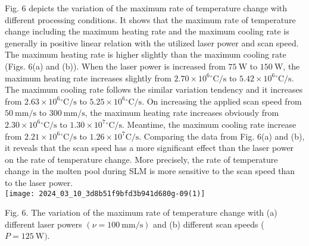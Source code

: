 \documentclass[10pt]{article}
\begin{document}
Fig. 6 depicts the variation of the maximum rate of temperature change with different processing conditions. It shows that the maximum rate of temperature change including the maximum heating rate and the maximum cooling rate is generally in positive linear relation with the utilized laser power and scan speed. The maximum heating rate is higher slightly than the maximum cooling rate (Figs. 6(a) and (b)). When the laser power is increased from $75 \mathrm{~W}$ to $150 \mathrm{~W}$, the maximum heating rate increases slightly from $2.70 \times 10^{6}{ }^{\circ} \mathrm{C} / \mathrm{s}$ to $5.42 \times 10^{6}{ }^{\circ} \mathrm{C} / \mathrm{s}$. The maximum cooling rate follows the similar variation tendency and it increases from $2.63 \times 10^{6}{ }^{\circ} \mathrm{C} / \mathrm{s}$ to $5.25 \times 10^{6}{ }^{\circ} \mathrm{C} / \mathrm{s}$. On increasing the applied scan speed from $50 \mathrm{~mm} / \mathrm{s}$ to $300 \mathrm{~mm} / \mathrm{s}$, the maximum heating rate increases obviously from $2.30 \times 10^{6}{ }^{\circ} \mathrm{C} / \mathrm{s}$ to $1.30 \times 10^{7}{ }^{\circ} \mathrm{C} / \mathrm{s}$. Meantime, the maximum cooling rate increase from $2.21 \times 10^{6}{ }^{\circ} \mathrm{C} / \mathrm{s}$ to $1.26 \times 10^{7} \mathrm{C} / \mathrm{s}$. Comparing the data from Fig. 6(a) and (b), it reveals that the scan speed has a more significant effect than the laser power on the rate of temperature change. More precisely, the rate of temperature change in the molten pool during SLM is more sensitive to the scan speed than to the laser power.\\
\texttt{[image: 2024\_03\_10\_3d8b51f9bfd3b941d680g-09(1)]}

Fig. 6. The variation of the maximum rate of temperature change with (a) different laser powers $(\nu=100 \mathrm{~mm} / \mathrm{s})$ and (b) different scan speeds ( $P=125 \mathrm{~W})$.
\end{document}
